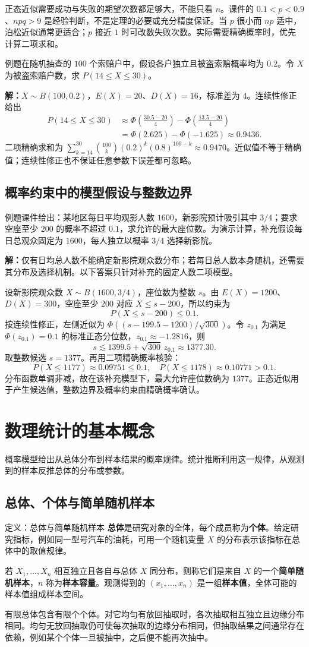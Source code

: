 \documentclass[UTF8,fontset=none,zihao=-4,a4paper]{ctexart}
\newcommand{\term}[1]{\textbf{#1}}
\newcommand{\example}[1]{\begin{infobox}{例题}#1\end{infobox}}
\newcommand{\solution}{\par\noindent\textbf{解：}}
\newcommand{\chapterpage}[1]{\clearpage\section{#1}}
\newcommand{\com}[2]{\binom{#1}{#2}}
\begin{document}
正态近似需要成功与失败的期望次数都足够大，不能只看 $n$。课件的 $0.1<p<0.9$、$npq>9$ 是经验判断，不是定理的必要或充分精度保证。当 $p$ 很小而 $np$ 适中，泊松近似通常更适合；$p$ 接近 $1$ 时可改数失败次数。实际需要精确概率时，优先计算二项求和。
\example{在随机抽查的 $100$ 个索赔户中，假设各户独立且被盗索赔概率均为 $0.2$。令 $X$ 为被盗索赔户数，求 $P(14\le X\le30)$。}
\solution $X\sim B(100,0.2)$，$E(X)=20$、$D(X)=16$，标准差为 $4$。连续性修正给出
\begin{align*}
P(14\le X\le30)&\approx
\Phi\left(\frac{30.5-20}{4}\right)
-\Phi\left(\frac{13.5-20}{4}\right)\\
&=\Phi(2.625)-\Phi(-1.625)\approx0.9436.
\end{align*}
二项精确求和为 $\sum_{k=14}^{30}\com{100}k(0.2)^k(0.8)^{100-k}\approx0.9470$。近似值不等于精确值；连续性修正也不保证任意参数下误差都可忽略。

\subsection{概率约束中的模型假设与整数边界}
\example{课件给出：某地区每日平均观影人数 $1600$，新影院预计吸引其中 $3/4$；要求空座至少 $200$ 的概率不超过 $0.1$，求允许的最大座位数。为演示计算，补充假设每日总观众固定为 $1600$，每人独立以概率 $3/4$ 选择新影院。}
\solution 仅有日均总人数不能确定新影院观众数分布；若每日总人数本身随机，还需要其分布及选择机制。以下答案只针对补充的固定人数二项模型。

设新影院观众数 $X\sim B(1600,3/4)$，座位数为整数 $s$。由 $E(X)=1200$、$D(X)=300$，空座至少 $200$ 对应 $X\le s-200$，所以约束为
\[
P(X\le s-200)\le0.1.
\]
按连续性修正，左侧近似为 $\Phi((s-199.5-1200)/\sqrt{300})$。令 $z_{0.1}$ 为满足 $\Phi(z_{0.1})=0.1$ 的标准正态分位数，$z_{0.1}\approx-1.2816$，则
\[
s\lesssim1399.5+\sqrt{300}\,z_{0.1}\approx1377.30.
\]
取整数候选 $s=1377$。再用二项精确概率核验：
\[
P(X\le1177)\approx0.09751\le0.1,\quad
P(X\le1178)\approx0.10771>0.1.
\]
分布函数单调非减，故在该补充模型下，最大允许座位数确为 $1377$。正态近似用于产生候选值，整数边界及概率约束由精确概率确认。

\chapterpage{数理统计的基本概念}
概率模型给出从总体分布到样本结果的概率规律。统计推断利用这一规律，从观测到的样本反推总体的分布或参数。

\subsection{总体、个体与简单随机样本}
\begin{infobox}{定义：总体与简单随机样本}
\term{总体}是研究对象的全体，每个成员称为\term{个体}。给定研究指标，例如同一型号汽车的油耗，可用一个随机变量 $X$ 的分布表示该指标在总体中的取值规律。

若 $X_1,\ldots,X_n$ 相互独立且各自与总体 $X$ 同分布，则称它们是来自 $X$ 的一个\term{简单随机样本}，$n$ 称为\term{样本容量}。观测得到的 $(x_1,\ldots,x_n)$ 是一组\term{样本值}，全体可能的样本值组成样本空间。
\end{infobox}
有限总体包含有限个个体。对它均匀有放回抽取时，各次抽取相互独立且边缘分布相同。均匀无放回抽取仍可使每次抽取的边缘分布相同，但抽取结果之间通常存在依赖，例如某个个体一旦被抽中，之后便不能再次抽中。
\end{document}
